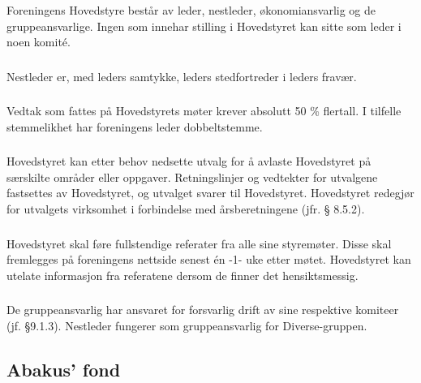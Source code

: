 \subsubsection{}
Foreningens Hovedstyre består av leder, nestleder, økonomiansvarlig og de
gruppeansvarlige. Ingen som innehar stilling i Hovedstyret kan sitte som leder i noen komité.

\subsubsection{}
Nestleder er, med leders samtykke, leders stedfortreder i leders fravær.

\subsubsection{}
Vedtak som fattes på Hovedstyrets møter krever absolutt 50 \% flertall. I
tilfelle stemmelikhet har foreningens leder dobbeltstemme.

\subsubsection{}
Hovedstyret kan etter behov nedsette utvalg for å avlaste Hovedstyret på
særskilte områder eller oppgaver. Retningslinjer og vedtekter for utvalgene
fastsettes av Hovedstyret, og utvalget svarer til Hovedstyret. Hovedstyret
redegjør for utvalgets virksomhet i forbindelse med årsberetningene (jfr. §
8.5.2).

\subsubsection{}
Hovedstyret skal føre fullstendige referater fra alle sine styremøter. Disse
skal fremlegges på foreningens nettside senest én -1- uke etter møtet.
Hovedstyret kan utelate informasjon fra referatene dersom de finner det
hensiktsmessig.

\subsubsection{}
De gruppeansvarlig har ansvaret for forsvarlig drift av sine respektive komiteer (jf. §9.1.3).
Nestleder fungerer som gruppeansvarlig for Diverse-gruppen.

\subsection{Abakus’ fond}

